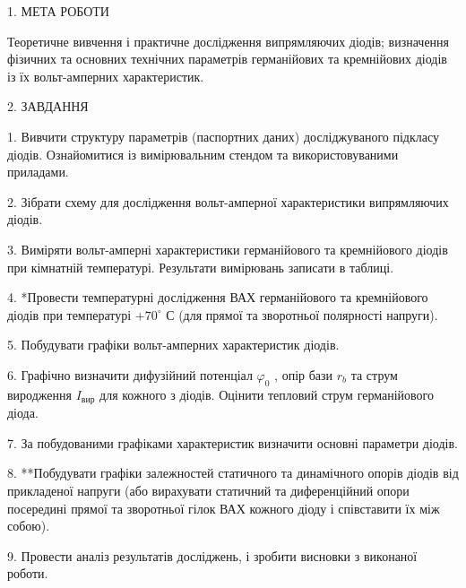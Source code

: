\documentclass[14pt,a4paper]{scrartcl}
\begin{document}
\begin{center}1. МЕТА РОБОТИ\\ \end{center}

Теоретичне вивчення і практичне дослідження випрямляючих діодів; визначення фізичних та основних технічних параметрів германійових та кремнійових діодів із їх вольт-амперних характеристик.\\

\begin{center}2. ЗАВДАННЯ\\ \end{center}

1. Вивчити структуру параметрів (паспортних даних) досліджуваного підкласу діодів.
Ознайомитися із вимірювальним стендом та використовуваними приладами.\par
2. Зібрати схему для дослідження вольт-амперної характеристики випрямляючих діодів.\par
3. Виміряти вольт-амперні характеристики германійового та кремнійового діодів при
кімнатній температурі. Результати вимірювань записати в таблиці.\par
4. *Провести температурні дослідження ВАХ германійового та кремнійового діодів при
температурі $+70^\circ$ С (для прямої та зворотньої полярності напруги).\par
5. Побудувати графіки вольт-амперних характеристик діодів.\par
6. Графічно визначити дифузійний потенціал $\varphi_0$ , опір бази $r_b$ та струм виродження $I_\text{вир}$ для
кожного з діодів. Оцінити тепловий струм германійового діода.\par
7. За побудованими графіками характеристик визначити основні параметри діодів.\par
8. **Побудувати графіки залежностей статичного та динамічного опорів діодів від
прикладеної напруги (або вирахувати статичний та диференційний опори посередині прямої та
зворотньої гілок ВАХ кожного діоду і співставити їх між собою).\par
9. Провести аналіз результатів досліджень, і зробити висновки з виконаної роботи.
\newpage
\end{document}
